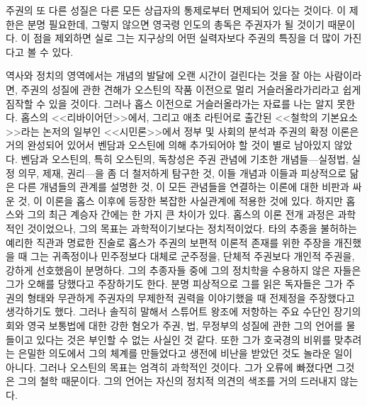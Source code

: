 주권의 또 다른 성질은
다른
모든
상급자의 통제로부터 면제되어 있다는 것이다.
이 제한은 분명 필요한데,
그렇지 않으면 영국령 인도의 총독은 주권자가 될 것이기 때문이다.
이 점을 제외하면
실로 그는 지구상의 어떤 실력자보다 주권의 특징을 더 많이 가진다고
볼 수 있다.

역사와 정치의 영역에서는 개념의 발달에 오랜 시간이 걸린다는 것을
잘 아는 사람이라면,
주권의 성질에 관한 견해가 오스틴의 작품 이전으로 멀리 거슬러올라가리라고
쉽게 짐작할 수 있을 것이다.
그러나 홉스 이전으로 거슬러올라가는 자료를 나는 알지 못한다.
홉스의 <<리바이어던>>에서, 그리고 애초 라틴어로 출간된
<<철학의 기본요소>>라는 논저의 일부인
<<시민론>>에서
정부 및 사회의 분석과 주권의 확정 이론은 거의 완성되어 있어서
벤담과 오스틴에 의해 추가되어야 할 것이 별로 남아있지 않았다.
벤담과 오스틴의, 특히 오스틴의, 독창성은
주권 관념에 기초한 개념들---실정법, 실정 의무, 제재, 권리---을 좀 더
철저하게 탐구한 것,
이들 개념과 이들과 피상적으로 닮은 다른 개념들의 관계를 설명한 것,
이 모든 관념들을 연결하는 이론에 대한 비판과 싸운 것,
이 이론을 홉스 이후에 등장한 복잡한 사실관계에 적용한 것에 있다.
하지만 홉스와 그의 최근 계승자 간에는 한 가지 큰 차이가 있다.
홉스의 이론 전개 과정은 과학적인 것이었으나,
그의 목표는 과학적이기보다는 정치적이었다.
타의 추종을 불허하는
예리한 직관과 명료한 진술로
홉스가 주권의 보편적 이론적 존재를 위한 주장을 개진했을 때
그는 귀족정이나 민주정보다 대체로 군주정을,
단체적 주권보다 개인적 주권을,
강하게 선호했음이 분명하다.
그의 추종자들 중에
그의 정치학을 수용하지 않은 자들은
그가 오해를 당했다고 주장하기도 한다.
분명 피상적으로 그를 읽은 독자들은
그가
주권의 형태와 무관하게 주권자의 무제한적 권력을 이야기했을 때
전제정을 주장했다고 생각하기도 했다.
그러나 솔직히 말해서
스튜어트 왕조에 저항하는 주요 수단인
장기의회와 영국 보통법에 대한 강한
혐오가 주권, 법, 무정부의 성질에 관한 그의 언어를 물들이고 있다는 것은
부인할 수 없는 사실인 것 같다.
또한 그가
호국경의 비위를 맞추려는 은밀한 의도에서
그의 체계를 만들었다고 생전에 비난을 받았던 것도
놀라운 일이 아니다.
그러나 오스틴의 목표는 엄격히 과학적인 것이다.
그가 오류에 빠졌다면 그것은 그의 철학 때문이다.
그의 언어는 자신의 정치적 의견의 색조를 거의 드러내지 않는다.

